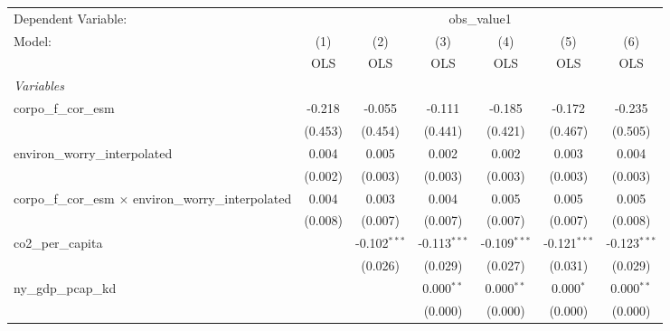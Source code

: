 
\begingroup
\centering
\begin{tabular}{lcccccc}
   \toprule
   Dependent Variable: & \multicolumn{6}{c}{obs\_value1}\\
   Model:                                                         & (1)     & (2)            & (3)            & (4)            & (5)            & (6)\\  
                                                                  &  OLS    & OLS            & OLS            & OLS            & OLS            & OLS\\  
   \midrule
   \emph{Variables}\\
   corpo\_f\_cor\_esm                                             & -0.218  & -0.055         & -0.111         & -0.185         & -0.172         & -0.235\\   
                                                                  & (0.453) & (0.454)        & (0.441)        & (0.421)        & (0.467)        & (0.505)\\   
   environ\_worry\_interpolated                                   & 0.004   & 0.005          & 0.002          & 0.002          & 0.003          & 0.004\\   
                                                                  & (0.002) & (0.003)        & (0.003)        & (0.003)        & (0.003)        & (0.003)\\   
   corpo\_f\_cor\_esm $\times$ environ\_worry\_interpolated       & 0.004   & 0.003          & 0.004          & 0.005          & 0.005          & 0.005\\   
                                                                  & (0.008) & (0.007)        & (0.007)        & (0.007)        & (0.007)        & (0.008)\\   
   co2\_per\_capita                                               &         & -0.102$^{***}$ & -0.113$^{***}$ & -0.109$^{***}$ & -0.121$^{***}$ & -0.123$^{***}$\\   
                                                                  &         & (0.026)        & (0.029)        & (0.027)        & (0.031)        & (0.029)\\   
   ny\_gdp\_pcap\_kd                                              &         &                & 0.000$^{**}$   & 0.000$^{**}$   & 0.000$^{*}$    & 0.000$^{**}$\\   
                                                                  &         &                & (0.000)        & (0.000)        & (0.000)        & (0.000)\\   

\end{tabular}
